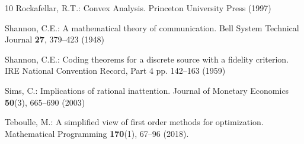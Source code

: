 \documentclass[smallextended,referee,envcountsect,]{svjour3}
\begin{document}
\begin{thebibliography}{10}
Rockafellar, R.T.: Convex Analysis.
\newblock Princeton University Press (1997)

Shannon, C.E.: A mathematical theory of communication.
\newblock Bell System Technical Journal \textbf{27}, 379--423 (1948)

Shannon, C.E.: Coding theorems for a discrete source with a fidelity criterion.
\newblock IRE National Convention Record, Part 4 pp. 142--163 (1959)

Sims, C.: {Implications} of rational inattention.
\newblock Journal of Monetary Economics \textbf{50}(3), 665--690 (2003)

Teboulle, M.: A simplified view of first order methods for optimization.
\newblock Mathematical Programming \textbf{170}(1), 67--96 (2018).
\newblock {}

\end{thebibliography}


\end{document}
